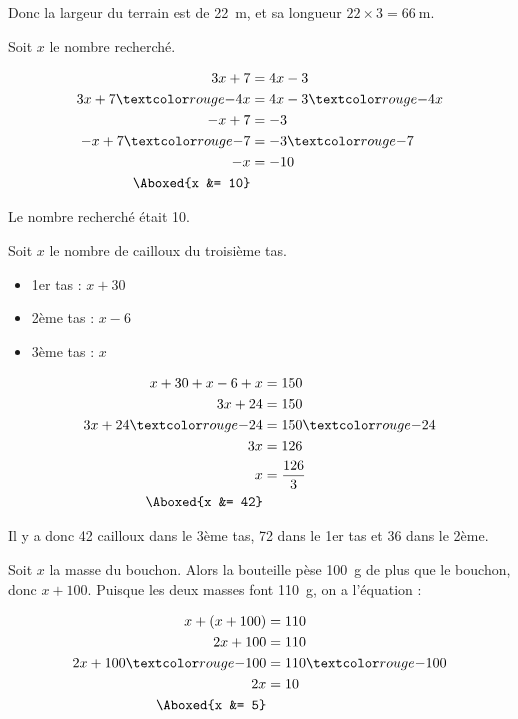 \documentclass["../Cours.tex"]{subfiles}
\begin{document}
\begin{questions}
    Donc la largeur du terrain est de \qty{22}{\metre}, et sa longueur $22 \times 3 = \qty{66}{\metre}$.

    \clearpage
    \exercice Soit $x$ le nombre recherché.

    \begin{align*}
        3x + 7 &= 4x - 3 \\ 
        3x + 7 \red{-4x} &= 4x - 3 \red{-4x} \\ 
        -x + 7 &= -3 \\ 
        -x + 7 \red{-7} &= -3\red{-7} \\ 
        -x &= -10 \\ 
        \Aboxed{x &= 10}
    \end{align*}

    Le nombre recherché était 10.

    \exercice Soit $x$ le nombre de cailloux du troisième tas.
    \begin{itemize}
        \item 1er tas : $x+30$
        \item 2ème tas : $x - 6$
        \item 3ème tas : $x$
    \end{itemize}

    \begin{align*}
        x+30 + x-6 + x &= 150 \\ 
        3x +24 &= 150 \\
        3x +24 \red{-24} &= 150 \red{-24} \\ 
        3x &= 126 \\ 
        x &= \frac{126}{3} \\ 
        \Aboxed{x &= 42}
    \end{align*}

    Il y a donc 42 cailloux dans le 3ème tas, 72 dans le 1er tas et 36 dans le 2ème.

    \exercice Soit $x$ la masse du bouchon. Alors la bouteille pèse \qty{100}{\gram} de plus que le bouchon, donc $x+100$. Puisque les deux masses font \qty{110}{\gram}, on a l'équation : 

    \begin{align*}
        x + (x+100) &= 110 \\ 
        2x + 100 &= 110 \\ 
        2x + 100 \red{-100} &= 110 \red{-100} \\ 
        2x &= 10 \\ 
        \Aboxed{x &= 5}
    \end{align*}


\end{questions}
\end{document}
